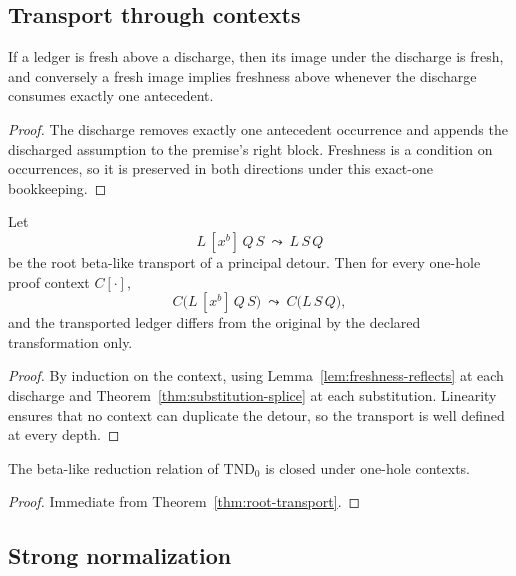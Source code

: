 \subsection{Transport through contexts}

\begin{lemma}\label{lem:freshness-reflects}
If a ledger is fresh above a discharge, then its image under the discharge is fresh, and
conversely a fresh image implies freshness above whenever the discharge consumes exactly
one antecedent.
\end{lemma}

\begin{proof}
The discharge removes exactly one antecedent occurrence and appends the discharged
assumption to the premise's right block.  Freshness is a condition on occurrences, so it is
preserved in both directions under this exact-one bookkeeping.
\end{proof}

\begin{theorem}\label{thm:root-transport}
Let
\[
  L\,[x^{b}]\,Q\,S\ \leadsto\ L\,S\,Q
\]
be the root beta-like transport of a principal detour.  Then for every one-hole proof
context $C[\cdot]$,
\[
  C\bigl(L\,[x^{b}]\,Q\,S\bigr)\ \leadsto\ C\bigl(L\,S\,Q\bigr),
\]
and the transported ledger differs from the original by the declared transformation only.
\end{theorem}

\begin{proof}
By induction on the context, using Lemma~\ref{lem:freshness-reflects} at each discharge and
Theorem~\ref{thm:substitution-splice} at each substitution.  Linearity ensures that no
context can duplicate the detour, so the transport is well defined at every depth.
\end{proof}

\begin{corollary}\label{cor:contextual-closure}
The beta-like reduction relation of $\mathrm{TND}_0$ is closed under one-hole contexts.
\end{corollary}

\begin{proof}
Immediate from Theorem~\ref{thm:root-transport}.
\end{proof}

\subsection{Strong normalization}

